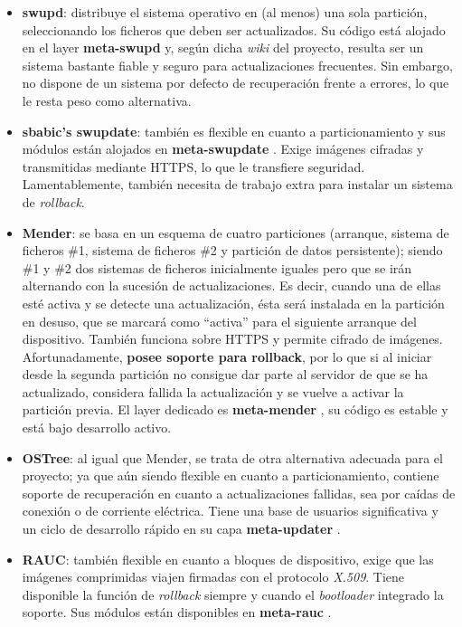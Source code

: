 \begin{itemize}
	\item \textbf{swupd}: distribuye el sistema operativo en (al menos) una sola partición, seleccionando los ficheros que deben ser actualizados. Su código está alojado en el layer \textbf{meta-swupd} \cite{meta-swupd} y, según dicha \textit{wiki} del proyecto, resulta ser un sistema bastante fiable y seguro para actualizaciones frecuentes. Sin embargo, no dispone de un sistema por defecto de recuperación frente a errores, lo que le resta peso como alternativa.
	\item \textbf{sbabic's swupdate}: también es flexible en cuanto a particionamiento y sus módulos están alojados en \textbf{meta-swupdate} \cite{meta-swupdate}. Exige imágenes cifradas y transmitidas mediante HTTPS, lo que le transfiere seguridad. Lamentablemente, también necesita de trabajo extra para instalar un sistema de \textit{rollback}.
	\item \textbf{Mender}: se basa en un esquema de cuatro particiones (arranque, sistema de ficheros \#1, sistema de ficheros \#2 y partición de datos persistente); siendo \#1 y \#2 dos sistemas de ficheros inicialmente iguales pero que se irán alternando con la sucesión de actualizaciones. Es decir, cuando una de ellas esté activa y se detecte una actualización, ésta será instalada en la partición en desuso, que se marcará como ``activa'' para el siguiente arranque del dispositivo. También funciona sobre HTTPS y permite cifrado de imágenes. Afortunadamente, \textbf{posee soporte para rollback}, por lo que si al iniciar desde la segunda partición no consigue dar parte al servidor de que se ha actualizado, considera fallida la actualización y se vuelve a activar la partición previa. El layer dedicado es \textbf{meta-mender} \cite{meta-mender}, su código es estable y está bajo desarrollo activo.
	\item \textbf{OSTree}: al igual que Mender, se trata de otra alternativa adecuada para el proyecto; ya que aún siendo flexible en cuanto a particionamiento, contiene soporte de recuperación en cuanto a actualizaciones fallidas, sea por caídas de conexión o de corriente eléctrica. Tiene una base de usuarios significativa y un ciclo de desarrollo rápido en su capa \textbf{meta-updater} \cite{meta-updater}.
	\item \textbf{RAUC}: también flexible en cuanto a bloques de dispositivo, exige que las imágenes comprimidas viajen firmadas con el protocolo \textit{X.509}. Tiene disponible la función de \textit{rollback} siempre y cuando el \textit{bootloader} integrado la soporte. Sus módulos están disponibles en \textbf{meta-rauc} \cite{meta-rauc}.
\end{itemize}

